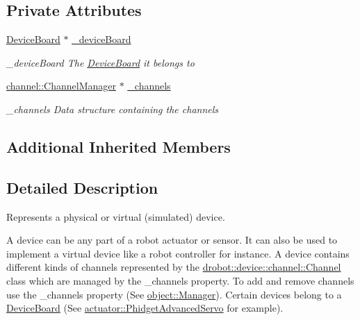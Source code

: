 \subsection*{Private Attributes}
\begin{DoxyCompactItemize}
\item 
\hypertarget{classdrobot_1_1device_1_1Device_abb3a110d904ae7de3abae5415fc273a3}{\hyperlink{classdrobot_1_1device_1_1DeviceBoard}{Device\-Board} $\ast$ \hyperlink{classdrobot_1_1device_1_1Device_abb3a110d904ae7de3abae5415fc273a3}{\-\_\-device\-Board}}\label{classdrobot_1_1device_1_1Device_abb3a110d904ae7de3abae5415fc273a3}

\begin{DoxyCompactList}\small\item\em \-\_\-device\-Board The \hyperlink{classdrobot_1_1device_1_1DeviceBoard}{Device\-Board} it belongs to \end{DoxyCompactList}\item 
\hypertarget{classdrobot_1_1device_1_1Device_a3f909e61d1a8e821aa57cc12291ef1a9}{\hyperlink{classdrobot_1_1device_1_1channel_1_1ChannelManager}{channel\-::\-Channel\-Manager} $\ast$ \hyperlink{classdrobot_1_1device_1_1Device_a3f909e61d1a8e821aa57cc12291ef1a9}{\-\_\-channels}}\label{classdrobot_1_1device_1_1Device_a3f909e61d1a8e821aa57cc12291ef1a9}

\begin{DoxyCompactList}\small\item\em \-\_\-channels Data structure containing the channels \end{DoxyCompactList}\end{DoxyCompactItemize}
\subsection*{Additional Inherited Members}


\subsection{Detailed Description}
Represents a physical or virtual (simulated) device. 

A device can be any part of a robot actuator or sensor. It can also be used to implement a virtual device like a robot controller for instance. A device contains different kinds of channels represented by the \hyperlink{classdrobot_1_1device_1_1channel_1_1Channel}{drobot\-::device\-::channel\-::\-Channel} class which are managed by the \-\_\-channels property. To add and remove channels use the \-\_\-channels property (See \hyperlink{classdrobot_1_1object_1_1Manager}{object\-::\-Manager}). Certain devices belong to a \hyperlink{classdrobot_1_1device_1_1DeviceBoard}{Device\-Board} (See \hyperlink{classdrobot_1_1device_1_1actuator_1_1PhidgetAdvancedServo}{actuator\-::\-Phidget\-Advanced\-Servo} for example). 

